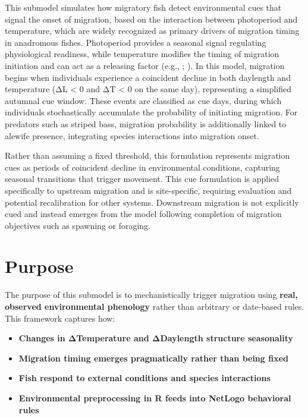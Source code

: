 \documentclass[
]{book}
\providecommand{\tightlist}{%
  \setlength{\itemsep}{0pt}\setlength{\parskip}{0pt}}
\begin{document}
This submodel simulates how migratory fish detect environmental cues that signal the onset of migration, based on the interaction between photoperiod and temperature, which are widely recognized as primary drivers of migration timing in anadromous fishes. Photoperiod provides a seasonal signal regulating physiological readiness, while temperature modifies the timing of migration initiation and can act as a releasing factor (e.g., \citet{zydlewski_photoperiod_2014}; \citet{garcia-vega_upstream_2022}). In this model, migration begins when individuals experience a coincident decline in both daylength and temperature (ΔL \textless{} 0 and ΔT \textless{} 0 on the same day), representing a simplified autumnal cue window. These events are classified as cue days, during which individuals stochastically accumulate the probability of initiating migration. For predators such as striped bass, migration probability is additionally linked to alewife presence, integrating species interactions into migration onset.

Rather than assuming a fixed threshold, this formulation represents migration cues as periods of coincident decline in environmental conditions, capturing seasonal transitions that trigger movement. This cue formulation is applied specifically to upstream migration and is site-specific, requiring evaluation and potential recalibration for other systems. Downstream migration is not explicitly cued and instead emerges from the model following completion of migration objectives such as spawning or foraging.

\section{Purpose}\label{purpose-3}

The purpose of this submodel is to mechanistically trigger migration using \textbf{real, observed environmental phenology} rather than arbitrary or date-based rules. This framework captures how:

\begin{itemize}
\tightlist
\item
  \textbf{Changes in ΔTemperature and ΔDaylength structure seasonality}
\item
  \textbf{Migration timing emerges pragmatically rather than being fixed}
\item
  \textbf{Fish respond to external conditions and species interactions}
\item
  \textbf{Environmental preprocessing in R feeds into NetLogo behavioral rules}
\end{itemize}
\end{document}
